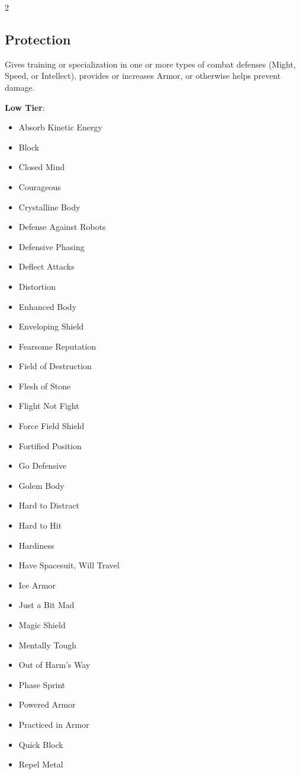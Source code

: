 \begin{multicols}{2}
\subsection{Protection}

Gives training or specialization in one or more types of combat defenses (Might, Speed, or Intellect), provides or increases Armor, or otherwise helps prevent damage.

\textbf{Low Tier}:

\begin{itemize}
\item Absorb Kinetic Energy
\item Block
\item Closed Mind
\item Courageous
\item Crystalline Body
\item Defense Against Robots
\item Defensive Phasing
\item Deflect Attacks
\item Distortion
\item Enhanced Body
\item Enveloping Shield
\item Fearsome Reputation
\item Field of Destruction
\item Flesh of Stone
\item Flight Not Fight
\item Force Field Shield
\item Fortified Position
\item Go Defensive
\item Golem Body
\item Hard to Distract
\item Hard to Hit
\item Hardiness
\item Have Spacesuit, Will Travel
\item Ice Armor
\item Just a Bit Mad
\item Magic Shield
\item Mentally Tough
\item Out of Harm’s Way
\item Phase Sprint
\item Powered Armor
\item Practiced in Armor
\item Quick Block
\item Repel Metal

\end{itemize}
\end{multicols}

